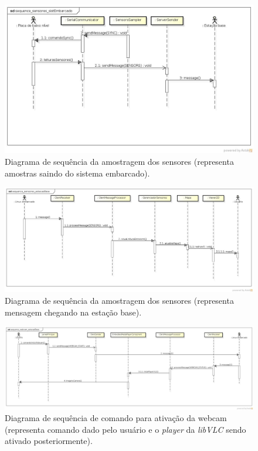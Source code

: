 \begin{figure}[H]
  \centering
  \includegraphics[width=\textwidth, keepaspectratio]{./figuras/sistEmbarcado/sequence_sensores_sistEmbarcado.jpg}
  \caption{Diagrama de sequência da amostragem dos sensores (representa amostras saindo do sistema embarcado).}
  \label{fig:diagrama_sequencia_sensores_sist_embarcado}
\end{figure}

\begin{figure}[H]
  \centering
  \includegraphics[width=\textwidth, keepaspectratio]{./figuras/estacaoBase/sequence_sensores_estacaoBase.jpg}
  \caption{Diagrama de sequência da amostragem dos sensores (representa mensagem chegando na estação base).}
  \label{fig:diagrama_sequencia_sensores_estacao_base}
\end{figure}

\begin{figure}[H]
  \centering
  \includegraphics[width=\textwidth, keepaspectratio]{./figuras/estacaoBase/sequence_webcam_estacaoBase.jpg}
  \caption{Diagrama de sequência de comando para ativação da webcam (representa comando dado pelo usuário e o \textit{player} da \textit{libVLC} sendo ativado posteriormente).}
  \label{fig:diagrama_sequencia_webcam_estacao_base}
\end{figure}

